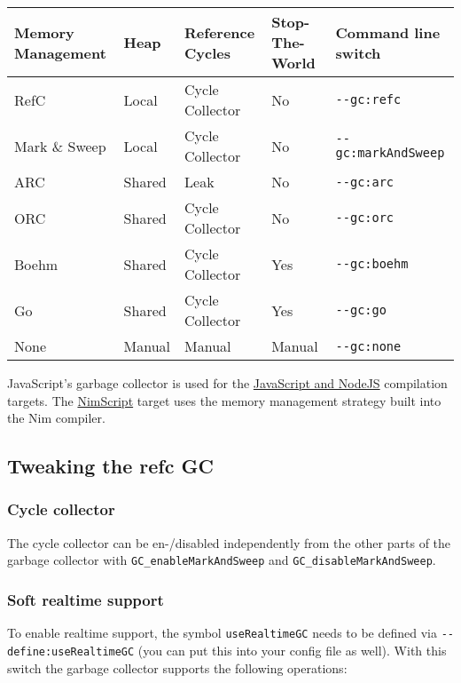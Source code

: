 \begin{longtable}[]{@{}lllll@{}}
\toprule
Memory Management & Heap & Reference Cycles & Stop-The-World & Command
line switch\tabularnewline
\midrule
\endhead
RefC & Local & Cycle Collector & No &
\texttt{-\/-gc:refc}\tabularnewline
Mark \& Sweep & Local & Cycle Collector & No &
\texttt{-\/-gc:markAndSweep}\tabularnewline
ARC & Shared & Leak & No & \texttt{-\/-gc:arc}\tabularnewline
ORC & Shared & Cycle Collector & No & \texttt{-\/-gc:orc}\tabularnewline
Boehm & Shared & Cycle Collector & Yes &
\texttt{-\/-gc:boehm}\tabularnewline
Go & Shared & Cycle Collector & Yes & \texttt{-\/-gc:go}\tabularnewline
None & Manual & Manual & Manual & \texttt{-\/-gc:none}\tabularnewline
\bottomrule
\end{longtable}

JavaScript's garbage collector is used for the
\href{backends.html\#backends-the-javascript-target}{JavaScript and
NodeJS} compilation targets. The \href{nims.html}{NimScript} target uses
the memory management strategy built into the Nim compiler.

\hypertarget{tweaking-the-refc-gc}{%
\subsection{Tweaking the refc GC}\label{tweaking-the-refc-gc}}

\hypertarget{cycle-collector}{%
\subsubsection{Cycle collector}\label{cycle-collector}}

The cycle collector can be en-/disabled independently from the other
parts of the garbage collector with \texttt{GC\_enableMarkAndSweep} and
\texttt{GC\_disableMarkAndSweep}.

\hypertarget{soft-realtime-support}{%
\subsubsection{Soft realtime support}\label{soft-realtime-support}}

To enable realtime support, the symbol \texttt{useRealtimeGC} needs to
be defined via \texttt{-\/-define:useRealtimeGC} (you can put this into
your config file as well). With this switch the garbage collector
supports the following operations:

\begin{verbatim}
\end{verbatim}

